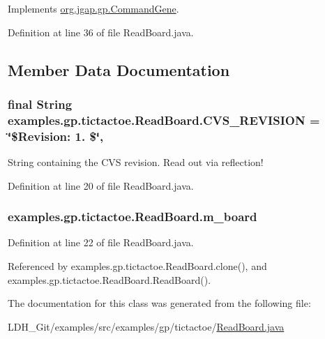 Implements \hyperlink{classorg_1_1jgap_1_1gp_1_1_command_gene_a236141d99059da808afe7a9217e411c7}{org.\-jgap.\-gp.\-Command\-Gene}.



Definition at line 36 of file Read\-Board.\-java.



\subsection{Member Data Documentation}
\hypertarget{classexamples_1_1gp_1_1tictactoe_1_1_read_board_ab7010c0fd462b8db73de0af19b97e897}{
\subsubsection[{C\-V\-S\-\_\-\-R\-E\-V\-I\-S\-I\-O\-N}]{\setlength{\rightskip}{0pt plus 5cm}final String examples.\-gp.\-tictactoe.\-Read\-Board.\-C\-V\-S\-\_\-\-R\-E\-V\-I\-S\-I\-O\-N = \char`\"{}\$Revision\-: 1. \$\char`\"{}\hspace{0.3cm}{\ttfamily [static]}, {\ttfamily [private]}}}\label{classexamples_1_1gp_1_1tictactoe_1_1_read_board_ab7010c0fd462b8db73de0af19b97e897}
String containing the C\-V\-S revision. Read out via reflection! 

Definition at line 20 of file Read\-Board.\-java.

\hypertarget{classexamples_1_1gp_1_1tictactoe_1_1_read_board_a493ed9edf5bff6046b98417fc1ce0537}{
\subsubsection[{m\-\_\-board}]{ examples.\-gp.\-tictactoe.\-Read\-Board.\-m\-\_\-board\hspace{0.3cm}{\ttfamily [private]}}}\label{classexamples_1_1gp_1_1tictactoe_1_1_read_board_a493ed9edf5bff6046b98417fc1ce0537}


Definition at line 22 of file Read\-Board.\-java.



Referenced by examples.\-gp.\-tictactoe.\-Read\-Board.\-clone(), and examples.\-gp.\-tictactoe.\-Read\-Board.\-Read\-Board().



The documentation for this class was generated from the following file\-:\begin{DoxyCompactItemize}
\item 
L\-D\-H\-\_\-\-Git/examples/src/examples/gp/tictactoe/\hyperlink{_read_board_8java}{Read\-Board.\-java}\end{DoxyCompactItemize}

